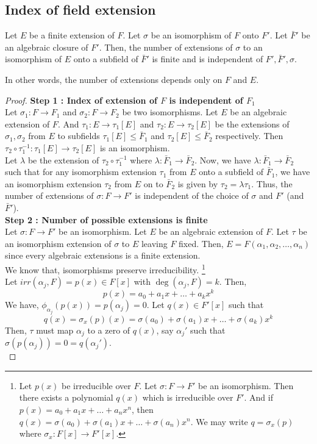 \subsection{Index of field extension}
\begin{theorem}
	Let $E$ be a finite extension of $F$.
	Let $\sigma$ be an isomorphism of $F$ onto $F'$.
	Let $\bar{F}'$ be an algebraic closure of $F'$.
	Then, the number of extensions of $\sigma$ to an isomorphism of $E$ onto a subfield of $\bar{F}'$ is finite and is independent of $F',\bar{F}',\sigma$.
\end{theorem}
\begin{important}
	In other words, the number of extensions depends only on $F$ and $E$.
\end{important}
\begin{proof}
	\textbf{Step 1 : Index of extension of $F$ is independent of $F_1$}\\
	Let $\sigma_1 : F \to F_1$ and $\sigma_2 : F \to F_2$ be two isomorphisms.
	Let $E$ be an algebraic extension of $F$.
	And $\tau_1 : E \to \tau_1[E]$ and $\tau_2 : E \to \tau_2[E]$ be the extensions of $\sigma_1,\sigma_2$ from $E$ to subfields $\tau_1[E] \le \bar{F}_1$ and $\tau_2[E] \le \bar{F}_2$ respectively.
	Then $\tau_2 \circ \tau_1^{-1} : \tau_1[E] \to \tau_2[E]$ is an isomorphism.\\

	Let $\lambda$ be the extension of $\tau_2 \circ \tau_1^{-1}$ where $\lambda : \bar{F}_1 \to \bar{F}_2$.
	Now, we have $\lambda : \bar{F}_1 \to \bar{F}_2$ such that for any isomorphism extension $\tau_1$ from $E$ onto a subfield of $\bar{F}_1$, we have an isomorphism extension $\tau_2$ from $E$ on to $\bar{F}_2$ is given by $\tau_2 = \lambda\tau_1$.
	Thus, the number of extensions of $\sigma : F \to F'$ is independent of the choice of $\sigma$ and $F'$ (and $\bar{F}'$).\\

	\textbf{Step 2 : Number of possible extensions is finite}\\
	Let $\sigma : F \to F'$ be an isomorphism.
	Let $E$ be an algebraic extension of $F$.
	Let $\tau$ be an isomorphism extension of $\sigma$ to $E$ leaving $F$ fixed.
	Then, $E = F(\alpha_1,\alpha_2,\dots,\alpha_n)$ since every algebraic extensions is a finite extension.\\

	We know that, isomorphisms preserve irreducibility.
	\dag\footnote{Let $p(x)$ be irreducible over $F$.
	Let $\sigma : F \to F'$ be an isomorphism.
	Then there exists a polynomial $q(x)$ which is irreducible over $F'$.
	And if $p(x) = a_0 + a_1 x + \dots +a_nx^n$, then $q(x) = \sigma(a_0) + \sigma(a_1)x +\dots + \sigma(a_n)x^n$.
	We may write $q = \sigma_x(p)$ where $\sigma_x : F[x] \to F'[x]$.}\\
	Let $irr(\alpha_j,F) = p(x) \in F[x]$ with $\deg(\alpha_j,F) = k$.
	Then, 
	\[ p(x) = a_0 + a_1 x + \dots + a_k x^k \]
	We have, $\phi_{\alpha_j}(p(x)) = p(\alpha_j) = 0$.
	Let $q(x) \in F'[x]$ such that 
	\[ q(x) = \sigma_x(p)(x) = \sigma(a_0) + \sigma(a_1) x + \dots + \sigma(a_k) x^k \]
	Then, $\tau$ must map $\alpha_j$ to a zero of $q(x)$, say $\alpha_j'$ such that $\sigma(p(\alpha_j)) = 0 = q(\alpha_j')$.\\


\end{proof}
